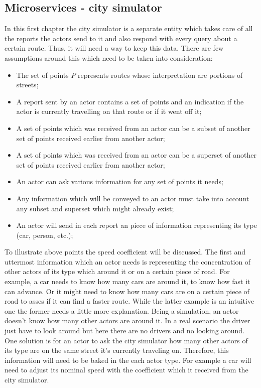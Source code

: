 \documentclass[a4paper,12pt,twoside]{book}
\begin{document}
\subsection{Microservices - city simulator}
\label{subsec:citysimulator}

In this first chapter the city simulator is a separate entity which takes care of all the reports the actors send to it and also respond with every query about a certain route. Thus, it will need a way to keep this data. There are few assumptions around this which need to be taken into consideration:

\begin{itemize}
    \item The set of points $P$ represents routes whose interpretation are portions of streets;
    \item A report sent by an actor contains a set of points and an indication if the actor is currently travelling on that route or if it went off it;
    \item A set of points which was received from an actor can be a subset of another set of points received earlier from another actor;
    \item A set of points which was received from an actor can be a superset of another set of points received earlier from another actor;
    \item An actor can ask various information for any set of points it needs;
    \item Any information which will be conveyed to an actor must take into account any subset and superset which might already exist;
    \item An actor will send in each report an piece of information representing its type (car, person, etc.);
\end{itemize}

To illustrate above points the speed coefficient will be discussed. The first and uttermost information which an actor needs is representing the concentration of other actors of its type which around it or on a certain piece of road. For example, a car needs to know how many cars are around it, to know how fast it can advance. Or it might need to know how many cars are on a certain piece of road to asses if it can find a faster route. While the latter example is an intuitive one the former needs a little more explanation. Being a simulation, an actor doesn't know how many other actors are around it. In a real scenario the driver just have to look around but here there are no drivers and no looking around. One solution is for an actor to ask the city simulator how many other actors of its type are on the same street it's currently traveling on. Therefore, this information will need to be baked in the each actor type. For example a car will need to adjust its nominal speed with the coefficient which it received from the city simulator.
\end{document}
